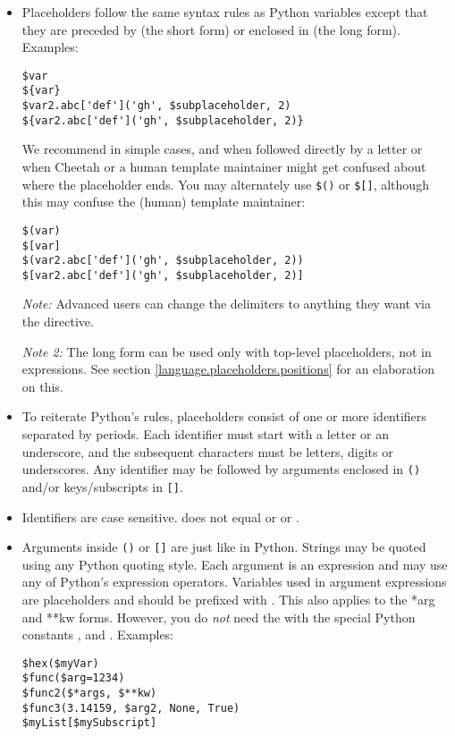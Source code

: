 \begin{itemize} 

\item Placeholders follow the same syntax rules as Python variables except
     that they are preceded by \code{\$} (the short form) or enclosed in
     \code{\$\{\}} (the long form).
     Examples:
\begin{verbatim}
$var                                        
${var}                                      
$var2.abc['def']('gh', $subplaceholder, 2)  
${var2.abc['def']('gh', $subplaceholder, 2)}
\end{verbatim}
     We recommend \code{\$} in simple cases, and \code{\$\{\}} when followed
     directly by a letter or when Cheetah or a human template maintainer might
     get confused about where the placeholder ends.  You may alternately use
     \verb+$()+ or \verb+$[]+, although this may confuse the (human) template
     maintainer:
\begin{verbatim}
$(var)                                      
$[var]                                      
$(var2.abc['def']('gh', $subplaceholder, 2))
$[var2.abc['def']('gh', $subplaceholder, 2)]
\end{verbatim}
     {\em Note:} Advanced users can change the delimiters to anything they
     want via the  directive.

     {\em Note 2:} The long form can be used only with top-level placeholders,
     not in expressions.  See section \ref{language.placeholders.positions}
     for an elaboration on this.

\item To reiterate Python's rules, placeholders consist of one or more
     identifiers separated by periods.  Each identifier must start with a letter
     or an underscore, and the subsequent characters must be letters, digits or
     underscores.  Any identifier may be followed by arguments enclosed in
     \verb+()+ and/or keys/subscripts in \verb+[]+.

\item Identifiers are case sensitive.  does not equal 
     or  or .     
     
\item Arguments inside \verb+()+ or \verb+[]+ are just like in Python.
    Strings may be quoted using any Python quoting style.  Each argument is an
    expression and may use any of Python's expression operators.  Variables
    used in argument expressions are placeholders and should be prefixed with
    \code{\$}.  This also applies to the *arg and **kw forms.  However, you do
    {\em not} need the \code{\$} with the special Python constants ,
     and .
     Examples:
\begin{verbatim}
$hex($myVar)
$func($arg=1234)
$func2($*args, $**kw)
$func3(3.14159, $arg2, None, True)
$myList[$mySubscript]
\end{verbatim}
    

\end{itemize}
